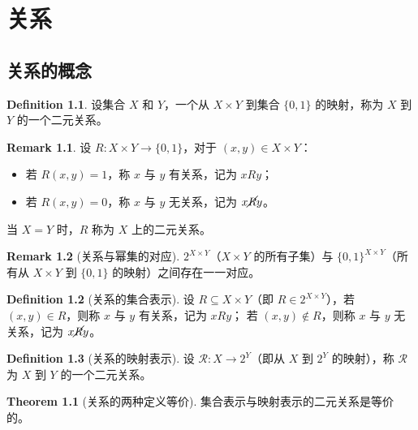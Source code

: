 \documentclass[oneside]{book}
\theoremstyle{definition}
\newtheorem{definition}{Definition}[section]
\newtheorem{theorem}{Theorem}[section]
\newtheorem{remark}{Remark}[section]
\begin{document}
		\chapter{关系}
			\section{关系的概念}
		
		\begin{definition}
			设集合 \( X \) 和 \( Y \)，一个从 \( X \times Y \) 到集合 \( \{0,1\} \) 的映射，称为 \( X \) 到 \( Y \) 的一个二元关系。
		\end{definition}
		
		\begin{remark}
			设 \( R: X \times Y \to \{0,1\} \)，对于 \( (x,y) \in X \times Y \)：
			\begin{itemize}
				\item 若 \( R(x,y) = 1 \)，称 \( x \) 与 \( y \) 有关系，记为 \( xRy \)；
				\item 若 \( R(x,y) = 0 \)，称 \( x \) 与 \( y \) 无关系，记为 \( x \cancel{R} y \)。
			\end{itemize}
			当 \( X = Y \) 时，\( R \) 称为 \( X \) 上的二元关系。
		\end{remark}
		
		\begin{remark}[关系与幂集的对应]
			\( 2^{X \times Y} \)（\( X \times Y \) 的所有子集）与 \( \{0,1\}^{X \times Y} \)（所有从 \( X \times Y \) 到 \( \{0,1\} \) 的映射）之间存在一一对应。
		\end{remark}
		
		\begin{definition}[关系的集合表示]
			设 \( R \subseteq X \times Y \)（即 \( R \in 2^{X \times Y} \)），若 \( (x,y) \in R \)，则称 \( x \) 与 \( y \) 有关系，记为 \( xRy \)；
			若 \( (x,y) \notin R \)，则称 \( x \) 与 \( y \) 无关系，记为 \( x \cancel{R} y \)。
		\end{definition}
		
		\begin{definition}[关系的映射表示]
			设 \( \mathcal{R}: X \to 2^Y \)（即从 \( X \) 到 \( 2^Y \) 的映射），称 \( \mathcal{R} \) 为 \( X \) 到 \( Y \) 的一个二元关系。
		\end{definition}
		
		\begin{theorem}[关系的两种定义等价]
			集合表示与映射表示的二元关系是等价的。
		\end{theorem}
		
\end{document}
